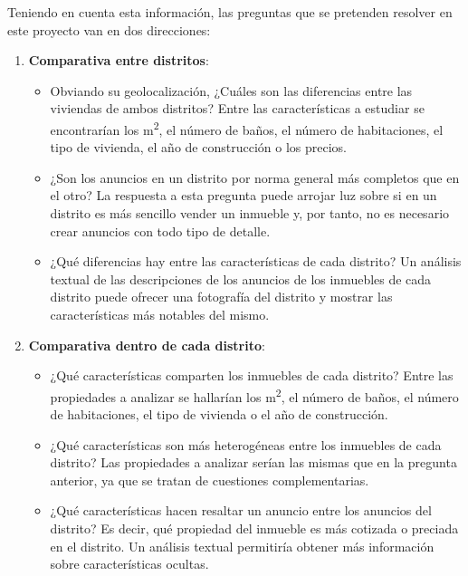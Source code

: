 \documentclass[12pt]{article}
\begin{document}
Teniendo en cuenta esta información, las preguntas que se pretenden resolver en este proyecto van en dos direcciones:
\begin{enumerate}[topsep=0cm,partopsep=0cm,wide]
	\item \textbf{Comparativa entre distritos}: 
		\begin{itemize}[topsep=0cm,partopsep=0cm]
			\item Obviando su geolocalización, ¿Cuáles son las diferencias entre las viviendas de ambos distritos? Entre las características a estudiar se encontrarían los m\textsuperscript{2}, el número de baños, el número de habitaciones, el tipo de vivienda, el año de construcción o los precios.
			
			\item ¿Son los anuncios en un distrito por norma general más completos que en el otro? La respuesta a esta pregunta puede arrojar luz sobre si en un distrito es más sencillo vender un inmueble y, por tanto, no es necesario crear anuncios con todo tipo de detalle.
			
			\item ¿Qué diferencias hay entre las características de cada distrito? Un análisis textual de las descripciones de los anuncios de los inmuebles de cada distrito puede ofrecer una fotografía del distrito y mostrar las características más notables del mismo.
		\end{itemize}
	
	\item \textbf{Comparativa dentro de cada distrito}:
		\begin{itemize}[topsep=0cm,partopsep=0cm]
			\item ¿Qué características comparten los inmuebles de cada distrito? Entre las propiedades a analizar se hallarían los m\textsuperscript{2}, el número de baños, el número de habitaciones, el tipo de vivienda o el año de construcción.
			
			\item ¿Qué características son más heterogéneas entre los inmuebles de cada distrito? Las propiedades a analizar serían las mismas que en la pregunta anterior, ya que se tratan de cuestiones complementarias.
			
			\item ¿Qué características hacen resaltar un anuncio entre los anuncios del distrito? Es decir, qué propiedad del inmueble es más cotizada o preciada en el distrito. Un análisis textual permitiría obtener más información sobre características ocultas.
		\end{itemize}

\end{enumerate}
\end{document}

